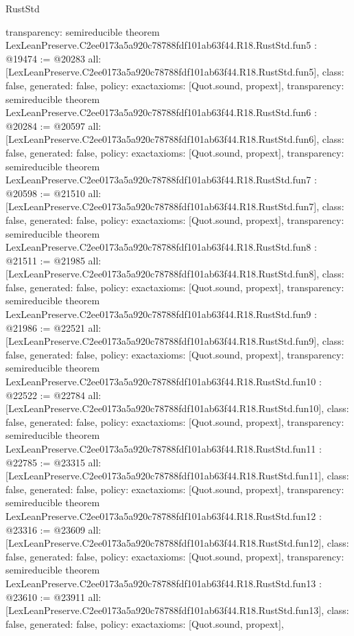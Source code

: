\begin{lexlean}{RustStd}
\begin{coremodule}
{  transparency: semireducible
}
theorem LexLeanPreserve.C2ee0173a5a920c78788fdf101ab63f44.R18.RustStd.fun5 : @19474 := @20283 {
  all: [LexLeanPreserve.C2ee0173a5a920c78788fdf101ab63f44.R18.RustStd.fun5],
  class: false,
  generated: false,
  policy: exact{axioms: [Quot.sound, propext]},
  transparency: semireducible
}
theorem LexLeanPreserve.C2ee0173a5a920c78788fdf101ab63f44.R18.RustStd.fun6 : @20284 := @20597 {
  all: [LexLeanPreserve.C2ee0173a5a920c78788fdf101ab63f44.R18.RustStd.fun6],
  class: false,
  generated: false,
  policy: exact{axioms: [Quot.sound, propext]},
  transparency: semireducible
}
theorem LexLeanPreserve.C2ee0173a5a920c78788fdf101ab63f44.R18.RustStd.fun7 : @20598 := @21510 {
  all: [LexLeanPreserve.C2ee0173a5a920c78788fdf101ab63f44.R18.RustStd.fun7],
  class: false,
  generated: false,
  policy: exact{axioms: [Quot.sound, propext]},
  transparency: semireducible
}
theorem LexLeanPreserve.C2ee0173a5a920c78788fdf101ab63f44.R18.RustStd.fun8 : @21511 := @21985 {
  all: [LexLeanPreserve.C2ee0173a5a920c78788fdf101ab63f44.R18.RustStd.fun8],
  class: false,
  generated: false,
  policy: exact{axioms: [Quot.sound, propext]},
  transparency: semireducible
}
theorem LexLeanPreserve.C2ee0173a5a920c78788fdf101ab63f44.R18.RustStd.fun9 : @21986 := @22521 {
  all: [LexLeanPreserve.C2ee0173a5a920c78788fdf101ab63f44.R18.RustStd.fun9],
  class: false,
  generated: false,
  policy: exact{axioms: [Quot.sound, propext]},
  transparency: semireducible
}
theorem LexLeanPreserve.C2ee0173a5a920c78788fdf101ab63f44.R18.RustStd.fun10 : @22522 := @22784 {
  all: [LexLeanPreserve.C2ee0173a5a920c78788fdf101ab63f44.R18.RustStd.fun10],
  class: false,
  generated: false,
  policy: exact{axioms: [Quot.sound, propext]},
  transparency: semireducible
}
theorem LexLeanPreserve.C2ee0173a5a920c78788fdf101ab63f44.R18.RustStd.fun11 : @22785 := @23315 {
  all: [LexLeanPreserve.C2ee0173a5a920c78788fdf101ab63f44.R18.RustStd.fun11],
  class: false,
  generated: false,
  policy: exact{axioms: [Quot.sound, propext]},
  transparency: semireducible
}
theorem LexLeanPreserve.C2ee0173a5a920c78788fdf101ab63f44.R18.RustStd.fun12 : @23316 := @23609 {
  all: [LexLeanPreserve.C2ee0173a5a920c78788fdf101ab63f44.R18.RustStd.fun12],
  class: false,
  generated: false,
  policy: exact{axioms: [Quot.sound, propext]},
  transparency: semireducible
}
theorem LexLeanPreserve.C2ee0173a5a920c78788fdf101ab63f44.R18.RustStd.fun13 : @23610 := @23911 {
  all: [LexLeanPreserve.C2ee0173a5a920c78788fdf101ab63f44.R18.RustStd.fun13],
  class: false,
  generated: false,
  policy: exact{axioms: [Quot.sound, propext]},
}
\end{coremodule}
\end{lexlean}
